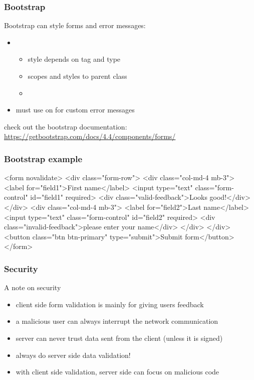 \begin{frame}[fragile] \frametitle{Bootstrap}
Bootstrap can style forms and error messages:
\begin{itemize}
  \item {}
          \\ 
  \begin{itemize}
    \item style depends on tag and type
    \item scopes  and  styles to parent  class 
    \item {}
  \end{itemize}
  \item must use  on  for custom error messages
\end{itemize}
\vspace{5mm}
check out the bootstrap documentation: \url{https://getbootstrap.com/docs/4.4/components/forms/}
\end{frame}

\begin{frame}[fragile] \frametitle{Bootstrap example}
\begin{CodeBox}{}
<form novalidate>
 <div class="form-row">
  <div class="col-md-4 mb-3">
   <label for="field1">First name</label>
   <input type="text" class="form-control" id="field1" required>
   <div class="valid-feedback">Looks good!</div>
  </div>
  <div class="col-md-4 mb-3">
   <label for="field2">Last name</label>
   <input type="text" class="form-control" id="field2" required>
   <div class="invalid-feedback">please enter your name</div>
  </div>
 </div>
 <button class="btn btn-primary" type="submit">Submit form</button>
</form>
\end{CodeBox}
\end{frame}
\begin{frame}[fragile] \frametitle{Security}
A note on security
\begin{itemize}
  \item client side form validation is mainly for giving users feedback
  \item a malicious user can always interrupt the network communication
  \item server can never trust data sent from the client (unless it is signed)
  \item always do server side data validation!
  \item with client side validation, server side can focus on malicious code
\end{itemize}
\end{frame}

